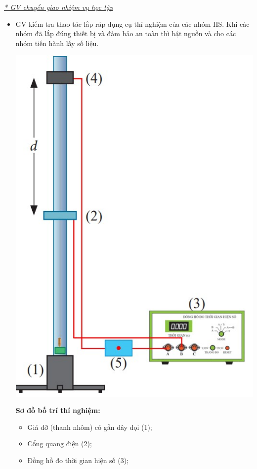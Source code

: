 {\textit{\underline{* GV chuyển giao nhiệm vụ học tập}}
	\begin{itemize}[label=-]
		\item GV kiểm tra thao tác lắp ráp dụng cụ thí nghiệm của các nhóm HS. Khi các nhóm đã lắp đúng thiết bị và đảm bảo an toàn thì bật nguồn và cho các nhóm tiến hành lấy số liệu.\\
		\begin{center}
			\includegraphics[scale=0.7]{figs/G10-BAI8-1}
		\end{center}
		\textbf{Sơ đồ bố trí thí nghiệm:}\\
		\begin{itemize}[label=$\bullet$]
			\item Giá đỡ (thanh nhôm) có gắn dây dọi (1);
			\item Cổng quang điện (2);
			\item Đồng hồ đo thời gian hiện số (3);

\end{itemize}
\end{itemize}}
